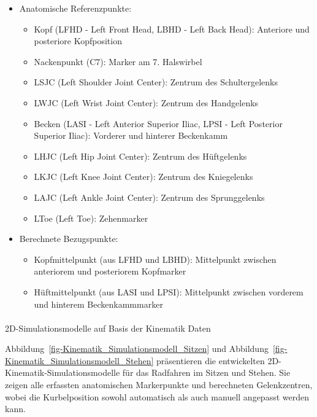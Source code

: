 \documentclass[
  letterpaper,
  DIV=11]{scrartcl}
\makeatletter
\let\oldparagraph\paragraph
\renewcommand{\paragraph}{
    \@ifstar
      \xxxParagraphStar
      \xxxParagraphNoStar
  }
\newcommand{\xxxParagraphStar}[1]{\oldparagraph*{#1}\mbox{}}
\newcommand{\xxxParagraphNoStar}[1]{\oldparagraph{#1}\mbox{}}
\providecommand{\tightlist}{%
  \setlength{\itemsep}{0pt}\setlength{\parskip}{0pt}}\usepackage{longtable,booktabs,array}
\makeatother
\begin{document}
\begin{itemize}
\tightlist
\item
  Anatomische Referenzpunkte:

  \begin{itemize}
  \tightlist
  \item
    Kopf (LFHD - Left Front Head, LBHD - Left Back Head): Anteriore und
    posteriore Kopfposition
  \item
    Nackenpunkt (C7): Marker am 7. Halswirbel
  \item
    LSJC (Left Shoulder Joint Center): Zentrum des Schultergelenks
  \item
    LWJC (Left Wrist Joint Center): Zentrum des Handgelenks
  \item
    Becken (LASI - Left Anterior Superior Iliac, LPSI - Left Posterior
    Superior Iliac): Vorderer und hinterer Beckenkamm
  \item
    LHJC (Left Hip Joint Center): Zentrum des Hüftgelenks
  \item
    LKJC (Left Knee Joint Center): Zentrum des Kniegelenks
  \item
    LAJC (Left Ankle Joint Center): Zentrum des Sprunggelenks
  \item
    LToe (Left Toe): Zehenmarker
  \end{itemize}
\item
  Berechnete Bezugspunkte:

  \begin{itemize}
  \tightlist
  \item
    Kopfmittelpunkt (aus LFHD und LBHD): Mittelpunkt zwischen anteriorem
    und posteriorem Kopfmarker
  \item
    Hüftmittelpunkt (aus LASI und LPSI): Mittelpunkt zwischen vorderem
    und hinterem Beckenkammmarker
  \end{itemize}
\end{itemize}

\paragraph{2D-Simulationsmodelle auf Basis der Kinematik
Daten}\label{d-simulationsmodelle-auf-basis-der-kinematik-daten}

Abbildung~\ref{fig-Kinematik_Simulationsmodell_Sitzen} und
Abbildung~\ref{fig-Kinematik_Simulationsmodell_Stehen} präsentieren die
entwickelten 2D-Kinematik-Simulationsmodelle für das Radfahren im Sitzen
und Stehen. Sie zeigen alle erfassten anatomischen Markerpunkte und
berechneten Gelenkzentren, wobei die Kurbelposition sowohl automatisch
als auch manuell angepasst werden kann.
\end{document}
